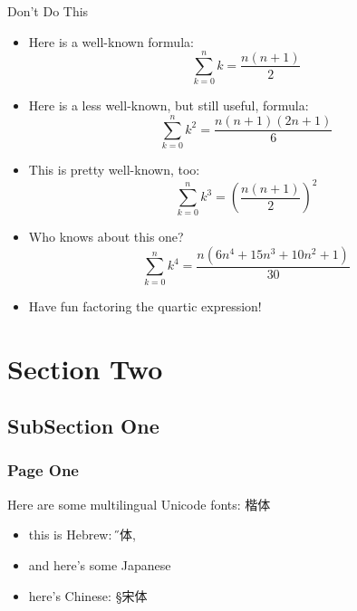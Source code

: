 \documentclass{beamer}
\begin{document}
\begin{frame}{Don't Do This}
\begin{itemize}
	\item Here is a well-known formula:\vspace{-.5em}
	$$\displaystyle \sum_{k=0}^{n} k = \frac{n(n+1)}{2}$$
	\item Here is a less well-known, but still useful, formula:\vspace{-.5em}
	$$\displaystyle \sum_{k=0}^{n} k^2 = \frac{n(n+1)(2n+1)}{6}$$
	\item This is pretty well-known, too:\vspace{-.5em}
	$$\displaystyle \sum_{k=0}^{n} k^3 = \left(\frac{n(n+1)}{2}\right)^2$$
	\item Who knows about this one?\vspace{-.5em}
	$$\displaystyle \sum_{k=0}^{n} k^4 = \frac{n(6n^4 + 15n^3 + 10n^2 + 1)}{30}$$
	\item Have fun factoring the quartic expression!
\end{itemize}
\end{frame}


\section{Section Two}

\subsection{SubSection One}

\begin{frame}
\frametitle{Page One}
Here are some multilingual Unicode fonts: 楷体
\begin{itemize}
 \item this is Hebrew: {\H 黑体}, 
   \item and here's some Japanese
   \item here's Chinese: {\S 宋体}
\end{itemize}
\end{frame}
\end{document}
